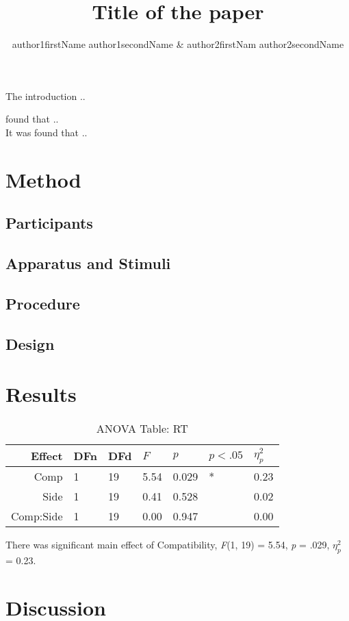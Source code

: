 \documentclass[man, 12pt]{apa6}\usepackage[]{graphicx}\usepackage[]{color}
\title{Title of the paper}
\author{author1firstName author1secondName \& author2firstNam
author2secondName}
\affiliation{Department of Psychology, University of XXX}
\begin{document}
\maketitle
The introduction .. \textcite{botvinick2001conflict}

\textcite{botvinick2001conflict} found that .. \\
It was found that .. \parencite[][]{simon1969reactions, eriksen1974effects, stroop1935studies}

\section{Method}
\subsection{Participants}
\subsection{Apparatus and Stimuli}
\subsection{Procedure}

\subsection{Design}

\section{Results}



\begin{longtable}{rllllll}
\caption{ANOVA Table: RT} \\ 
  \hline
Effect & DFn & DFd & $\textit{F}$ & $\textit{p}$ & $\textit{p}$$<.05$ & $\eta_{p}^2$ \\ 
  \hline
Comp & 1 & 19 & 5.54 & 0.029 & * & 0.23 \\ 
  Side & 1 & 19 & 0.41 & 0.528 &  & 0.02 \\ 
  Comp:Side & 1 & 19 & 0.00 & 0.947 &  & 0.00 \\ 
  \hline
\end{longtable}


There was significant main effect of Compatibility, \emph{F}(1, 19) = 5.54, \emph{p} = .029, $\eta_{p}^2$ = 0.23.

\section{Discussion}

\printbibliography
\end{document}
